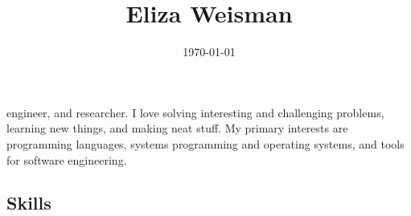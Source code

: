 \documentclass[a4paper]{tufte-handout}
\title{Eliza Weisman}
\author{}
\begin{document}
\date{\today}
\maketitle

\noindent
{} engineer, and researcher. I love solving interesting and challenging problems, learning new things, and making neat stuff. My primary interests are programming languages, systems programming and operating systems, and tools for software engineering.

\subsection{Skills}
\end{document}
